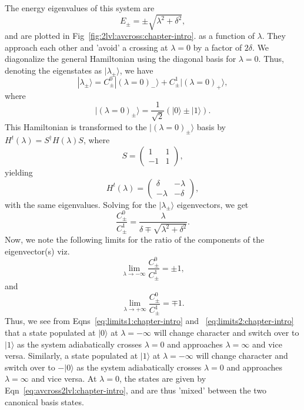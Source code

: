 The energy eigenvalues of this system are
\begin{equation}
E_\pm = \pm \sqrt{\lambda^2 + \delta^2},
\label{eq:2lvlen:chapter-intro}
\end{equation}
and are plotted in Fig~\ref{fig:2lvl:avcross:chapter-intro}. as a function of $\lambda$. They approach each other and 'avoid' a crossing at $\lambda=0$ by a factor of $2\delta$. We diagonalize the general Hamiltonian using the diagonal basis for $\lambda=0$. Thus, denoting the eigenstates as $| \lambda_\pm \rangle$, we have
\begin{equation}
| \lambda_\pm \rangle = C^0_\pm | (\lambda=0)_- \rangle + C^1_\pm | (\lambda=0)_+ \rangle,
\end{equation}
where 
\begin{equation}
| (\lambda=0)_\pm \rangle = \frac{1}{\sqrt{2}} \left( |0\rangle \pm |1\rangle \right).
\label{eq:avcross2lvl:chapter-intro}
\end{equation}
This Hamiltonian is transformed to the $|(\lambda=0)_\pm \rangle$ basis by $H^t(\lambda) = S^\dagger H(\lambda) S$, where
\begin{equation}
 S = \left(\begin{array}{cc}
        1 &1 \\
	-1 & 1
       \end{array}\right),
\end{equation}
yielding 
\begin{equation}
 H^t(\lambda)=\left(\begin{array}{cc}
                     \delta & -\lambda \\
		     -\lambda & -\delta
                    \end{array}\right),
\end{equation}
with the same eigenvalues. Solving for the $|\lambda_\pm \rangle$ eigenvectors, we get 
\begin{equation}
\frac{ C^0_\pm}{ C^1_\pm} = \frac{\lambda}{\delta \mp \sqrt{\lambda^2 + \delta^2}}.
\end{equation}
Now, we note the following limits for the ratio of the components of the eigenvector(s) viz.
\begin{equation}
\lim_{\lambda \to -\infty}\frac{ C^0_\pm}{ C^1_\pm} = \pm 1,
\label{eq:limits1:chapter-intro} 
\end{equation}
and
\begin{equation}
\lim_{\lambda \to +\infty}\frac{ C^0_\pm}{ C^1_\pm} = \mp 1 .
\label{eq:limits2:chapter-intro} 
\end{equation}
Thus, we see from Eqns~\ref{eq:limits1:chapter-intro} and ~\ref{eq:limits2:chapter-intro} that a state populated at $|0\rangle$ at $\lambda=-\infty$ will change character and switch over to $|1\rangle$ as the system adiabatically crosses $\lambda=0$ and approaches $\lambda=\infty$ and vice versa. Similarly, a state populated at $|1\rangle$ at $\lambda=-\infty$ will change character and switch over to $-|0\rangle$ as the system adiabatically crosses $\lambda=0$ and approaches $\lambda=\infty$ and vice versa. At $\lambda=0$, the states are given by Eqn~\ref{eq:avcross2lvl:chapter-intro}, and are thus 'mixed' between the two canonical basis states. 

